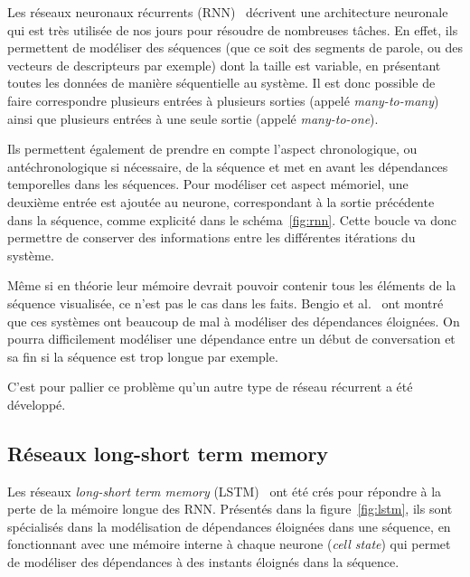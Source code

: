 Les réseaux neuronaux récurrents (RNN)~\cite{Jordan1986} décrivent une architecture neuronale qui est très utilisée de nos jours pour résoudre de nombreuses tâches. En effet, ils permettent de modéliser des séquences (que ce soit des segments de parole, ou des vecteurs de descripteurs par exemple) dont la taille est variable, en présentant toutes les données de manière séquentielle au système. Il est donc possible de faire correspondre plusieurs entrées à plusieurs sorties (appelé \textit{many-to-many}) ainsi que plusieurs entrées à une seule sortie (appelé \textit{many-to-one}). %

Ils permettent également de prendre en compte l'aspect chronologique, ou antéchronologique si nécessaire, de la séquence et met en avant les dépendances temporelles dans les séquences.
Pour modéliser cet aspect mémoriel, une deuxième entrée est ajoutée au neurone, correspondant à la sortie précédente dans la séquence, comme explicité dans le schéma~\ref{fig:rnn}. Cette boucle va donc permettre de conserver des informations entre les différentes itérations du système.

Même si en théorie leur mémoire devrait pouvoir contenir tous les éléments de la séquence visualisée, ce n'est pas le cas dans les faits. Bengio et al.~\cite{Bengio1994} ont montré que ces systèmes ont beaucoup de mal à modéliser des dépendances éloignées. On pourra difficilement modéliser une dépendance entre un début de conversation et sa fin si la séquence est trop longue par exemple.

C'est pour pallier ce problème qu'un autre type de réseau récurrent a été développé.

\subsection{Réseaux long-short term memory}


Les réseaux \textit{long-short term memory} (LSTM)~\cite{Hochreiter1997} ont été crés pour répondre à la perte de la mémoire longue des RNN. Présentés dans la figure~\ref{fig:lstm}, ils sont spécialisés dans la modélisation de dépendances éloignées dans une séquence, en fonctionnant avec une mémoire interne à chaque neurone (\textit{cell state}) qui permet de modéliser des dépendances à des instants éloignés dans la séquence.

